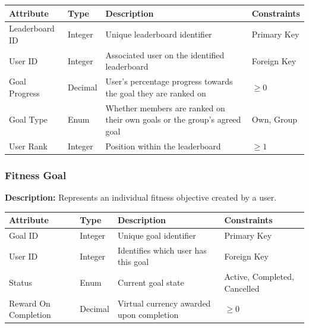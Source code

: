\documentclass[12pt]{article}
\begin{document}
\begin{xltabular}{\textwidth}{|p{3cm}|p{2cm}|X|p{3cm}|} 
    \hline 
    \textbf{Attribute} & \textbf{Type} & \textbf{Description} & \textbf{Constraints} \\ 
    \hline 
    
    Leaderboard ID & Integer & Unique leaderboard identifier & Primary Key \\ 
    \hline 
    
    User ID & Integer & Associated user on the identified leaderboard & Foreign Key \\ 
    \hline 
    
    Goal Progress & Decimal & User's percentage progress towards the goal they are ranked on & $\geq 0$ \\
    \hline

    Goal Type & Enum & Whether members are ranked on their own goals or the group's agreed goal & Own, Group \\
    \hline
    
    User Rank & Integer & Position within the leaderboard & $\geq 1$ \\ 
    \hline 
\end{xltabular}

\subsubsection{Fitness Goal} 

\textbf{Description:} Represents an individual fitness objective created by a user. 

\begin{xltabular}{\textwidth}{|p{3cm}|p{2cm}|X|p{3cm}|} 
    \hline 
    \textbf{Attribute} & \textbf{Type} & \textbf{Description} & \textbf{Constraints} \\ 
    \hline 
    
    Goal ID & Integer & Unique goal identifier & Primary Key \\ 
    \hline 
    
    User ID & Integer & Identifies which user has this goal & Foreign Key \\ 
    \hline 
    
    Status & Enum & Current goal state & Active, Completed, Cancelled \\ 
    \hline 
    
    Reward On Completion & Decimal & Virtual currency awarded upon completion & $\geq 0$ \\ 
    \hline 
\end{xltabular}
\end{document}
